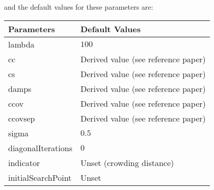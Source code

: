 \newline
\newline
and the default values for these parameters are:
\newline
\newline
\begin{tabularx}{\linewidth}{lX}
  \hline
  Parameters & Default Values \\
  \hline
  lambda & $100$ \\
  cc & Derived value (see reference paper) \\
  cs & Derived value (see reference paper) \\
  damps & Derived value (see reference paper) \\
  ccov & Derived value (see reference paper) \\
  ccovsep & Derived value (see reference paper) \\
  sigma & $0.5$ \\
  diagonalIterations & $0$ \\
  indicator & Unset (crowding distance) \\
  initialSearchPoint & Unset \\
  \hline
\end{tabularx}

